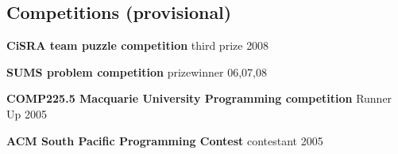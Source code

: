 \documentclass[margin,line]{resume}
\newcommand{\CVsection}[1]{\section{\mysidestyle #1}}
\newcommand{\entry}[3]{\textbf{#1} #2 \hfill {#3}
           
\vspace{-3.1mm}}
\newcommand{\FINALentry}[3]{\textbf{#1} #2 \hfill {#3}}
\begin{document}
\begin{resume}
\CVsection{Competitions (provisional)}
\entry{CiSRA team puzzle competition}{third prize}{2008}
\entry{SUMS problem competition}{prizewinner}{06,07,08}
\entry{COMP225.5 Macquarie University Programming competition}{Runner Up}{2005}
\FINALentry{ACM South Pacific Programming Contest}{contestant}{2005}

\end{resume}
\end{document}
